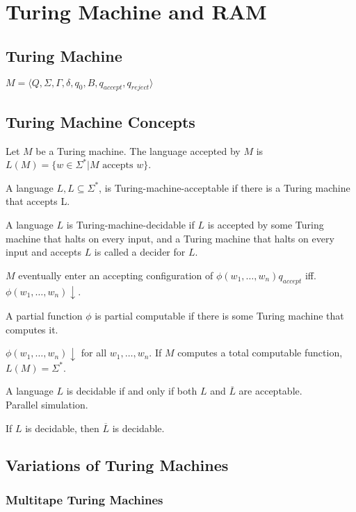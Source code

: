 \section{Turing Machine and RAM}

\subsection{Turing Machine}

 $M=\langle
Q,\Sigma,\Gamma,\delta,q_0,B,q_{accept},q_{reject}\rangle$

\subsection{Turing Machine Concepts}

 Let $M$ be a Turing machine. The language accepted by $M$ is
$L(M) = \{w \in \Sigma^* | M \text{ accepts } w\}$.

 A language $L, L \subseteq \Sigma^*$, is
Turing-machine-acceptable if there is a Turing machine
that accepts L.

 A language $L$ is Turing-machine-decidable if $L$ is accepted
by some Turing machine that halts on every input, and a Turing machine that halts on
every input and accepts $L$ is called a decider for $L$.

 $M$ eventually enter an accepting configuration of
$\phi(w_1,\ldots,w_n)q_{accept}$ iff.
$\phi(w_1,\ldots,w_n)\downarrow$.

 A partial function $\phi$ is partial computable if there
is some Turing machine
that computes it.

 $\phi(w_1,\ldots,w_n)\downarrow$ for all
$w_1,\ldots,w_n$. If $M$ computes a total computable function, $L(M)=\Sigma^*$.

 A language $L$ is decidable if and only if both $L$ and
$\overline{L}$ are acceptable.\\
Parallel simulation.


 If $L$ is decidable, then $\overline{L}$ is decidable.

\subsection{Variations of Turing Machines}

\subsubsection{Multitape Turing Machines}


